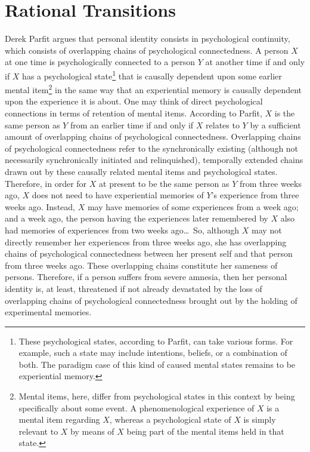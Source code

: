 \section{Rational Transitions }
Derek Parfit argues that personal identity consists in psychological
continuity, which consists of overlapping chains of psychological
connectedness. A person $X$ at one time is psychologically connected to a
person $Y$ at another time if and only if $X$ has a psychological state\footnote{These
  psychological states, according to Parfit, can take various forms. For
  example, such a state may include intentions, beliefs, or a
  combination of both. The paradigm case of this kind of caused mental
  states remains to be experiential memory.} that is causally dependent
upon some earlier mental item\footnote{Mental items, here, differ from
  psychological states in this context by being specifically about some
  event. A phenomenological experience of $X$ is a mental item regarding
  $X$, whereas a psychological state of $X$ is simply relevant to $X$ by means
  of $X$ being part of the mental items held in that state.} in the same
way that an experiential memory is causally dependent upon the
experience it is about. One may think of direct psychological
connections in terms of retention of mental items. According to Parfit,
$X$ is the same person as $Y$ from an earlier time if and only if $X$ relates to $Y$ by a
sufficient amount of overlapping chains of psychological connectedness.
Overlapping chains of psychological connectedness refer to the
synchronically existing (although not necessarily synchronically
initiated and relinquished), temporally extended chains drawn out by
these causally related mental items and psychological states. Therefore,
in order for $X$ at present to be the same person as $Y$ from
three weeks ago, $X$ does not need to have experiential memories of $Y$'s
experience from three weeks ago. Instead, $X$ may have memories of some
experiences from a week ago; and a week ago, the person having the
experiences later remembered by $X$ also had memories of experiences from
two weeks ago\ldots\ So, although $X$ may not directly remember her
experiences from three weeks ago, she has overlapping chains of
psychological connectedness between her present self and that person
from three weeks ago. These overlapping chains constitute her sameness
of persons. Therefore, if a person suffers from severe amnesia, then her
personal identity is, at least, threatened if not already devastated by
the loss of overlapping chains of psychological connectedness brought
out by the holding of experimental memories.

